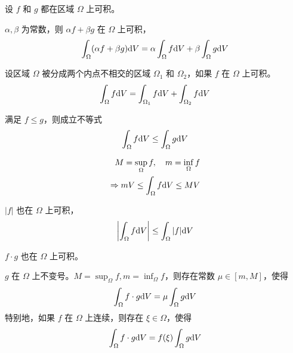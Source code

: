 \documentclass{ctexbook}
\def\diff{\textnormal{d}}
\begin{document}
\begin{proposition}[重积分的性质]
    设 $f$ 和 $g$ 都在区域 $\Omega$ 上可积。
    \begin{description}
        \item[线性性]  $\alpha,\beta$ 为常数，则 $\alpha f+\beta g$ 在 $\Omega$ 上可积，
        \begin{equation}
            \int_\Omega (\alpha f+\beta g)\diff V=\alpha\int_\Omega f\diff V+\beta\int_\Omega g\diff V
        \end{equation}
        \item[区域可加性] 设区域 $\Omega$ 被分成两个内点不相交的区域 $\Omega_1$ 和 $\Omega_2$，如果 $f$ 在 $\Omega$ 上可积。
        \begin{equation}
            \int_\Omega f\diff V=\int_{\Omega_1} f\diff V+\int_{\Omega_2} f\diff V
        \end{equation}
        \item[保序性] 满足 $f\leq g$，则成立不等式
        \begin{equation}
            \int_\Omega f\diff V\leq \int_\Omega g\diff V
        \end{equation}
        \item \begin{equation}
            \begin{aligned}
                M=\sup_\Omega f,\quad m=\inf_\Omega f\\
                \Rightarrow mV\leq \int_\Omega f\diff V\leq MV
            \end{aligned}
        \end{equation}
        \item[绝对可积性] $|f|$ 也在 $\Omega$ 上可积，
        \begin{equation}
            \left|\int_\Omega f\diff V\right|\leq\int_\Omega |f|\diff V
        \end{equation}
        \item[乘积可积性] $f\cdot g$ 也在 $\Omega$ 上可积。
        \item[积分中值定理] $g$ 在 $\Omega$ 上不变号。$M=\sup_\Omega f,m=\inf_\Omega f$，则存在常数 $\mu\in[m,M]$，使得
        \begin{equation}
            \int_\Omega f\cdot g\diff V=\mu\int_\Omega g\diff V
        \end{equation}
        特别地，如果 $f$ 在 $\Omega$ 上连续，则存在 $\xi\in\Omega$，使得
        \begin{equation}
            \int_\Omega f\cdot g\diff V=f(\xi)\int_\Omega g\diff V
        \end{equation}
    \end{description}
\end{proposition}
\end{document}

